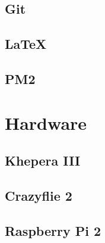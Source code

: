 \subsection{Git}
\subsection{\LaTeX}
\subsection{PM2}
\section{Hardware}
\subsection{Khepera III}
\subsection{Crazyflie 2}
\subsection{Raspberry Pi 2}
